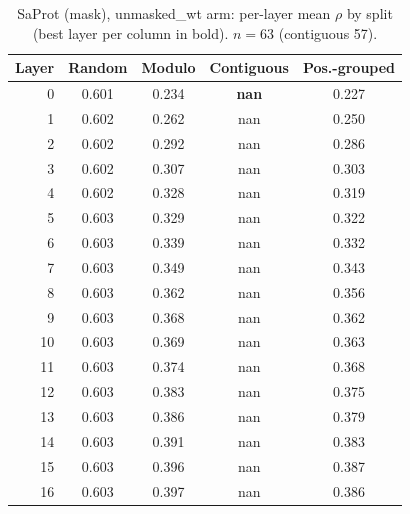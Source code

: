\documentclass[11pt,a4paper]{article}
\begin{document}
\begin{table}[H]\centering\small

\caption{SaProt (mask), unmasked\_wt arm: per-layer mean $\rho$ by split (best layer per column in bold). $n=63$ (contiguous 57).}

\label{tab:S2SaProtmaskunmasked_wt}

\begin{tabular}{rcccc}

\toprule

Layer & Random & Modulo & Contiguous & Pos.-grouped \\

\midrule

0 & 0.601 & 0.234 & \textbf{nan} & 0.227 \\

1 & 0.602 & 0.262 & nan & 0.250 \\

2 & 0.602 & 0.292 & nan & 0.286 \\

3 & 0.602 & 0.307 & nan & 0.303 \\

4 & 0.602 & 0.328 & nan & 0.319 \\

5 & 0.603 & 0.329 & nan & 0.322 \\

6 & 0.603 & 0.339 & nan & 0.332 \\

7 & 0.603 & 0.349 & nan & 0.343 \\

8 & 0.603 & 0.362 & nan & 0.356 \\

9 & 0.603 & 0.368 & nan & 0.362 \\

10 & 0.603 & 0.369 & nan & 0.363 \\

11 & 0.603 & 0.374 & nan & 0.368 \\

12 & 0.603 & 0.383 & nan & 0.375 \\

13 & 0.603 & 0.386 & nan & 0.379 \\

14 & 0.603 & 0.391 & nan & 0.383 \\

15 & 0.603 & 0.396 & nan & 0.387 \\

16 & 0.603 & 0.397 & nan & 0.386 \\


\end{tabular}
\end{table}
\end{document}
